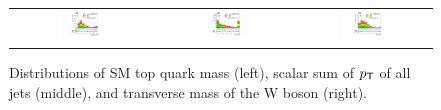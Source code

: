 \begin{figure}[tbh!]
 \begin{center}
 \begin{tabular}{ccc}
  \includegraphics[width=0.325\textwidth]{figures/Appendix/SRMC/Topmass}&
    \includegraphics[width=0.325\textwidth]{figures/Appendix/SRMC/JetHt}&
  \includegraphics[width=0.325\textwidth]{figures/Appendix/SRMC/tM}\\
 \end{tabular}
 \caption{Distributions of \ac{SM} top quark mass (left), scalar sum of $p_{\textsf{T}}$ of all jets (middle), and transverse mass of the W boson (right).}
 \label{fig:input_vali_3}
 \end{center}
\end{figure}


